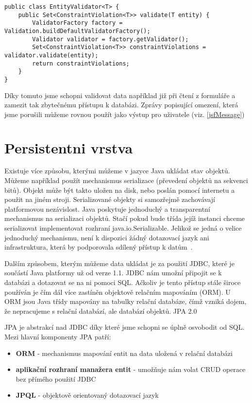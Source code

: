 \documentclass[122pt,oneside]{fithesis}
\begin{document}
\begin{lstlisting}
public class EntityValidator<T> {
	public Set<ConstraintViolation<T>> validate(T entity) {
		ValidatorFactory factory = Validation.buildDefaultValidatorFactory();
		Validator validator = factory.getValidator();
		Set<ConstraintViolation<T>> constraintViolations = validator.validate(entity);
		return constraintViolations;
	}
}
\end{lstlisting}

Díky tomuto jsme schopni validovat data například již při čtení z formuláře a zamezit tak zbytečnému přístupu k databázi. Zprávy popisující omezení, která jsme porušili můžeme rovnou použít jako výstup pro uživatele (viz. \ref{jsfMessage})

\section{Persistentni vrstva}
Existuje více způsobu, kterými můžeme v jazyce Java ukládat stav objektů. Můžeme například použít mechanismus serializace (převedení objektů na sekvenci bitů). Objekt může být takto uložen na disk, nebo poslán pomocí internetu a použit na jiném stroji. Serializované objekty si samozřejmě zachovávají platformovou nezávislost. Java poskytuje jednoduchý a transparentní mechanismus na serializaci objektů. Stačí pokud bude třída jejíž instanci chceme serializovat implementovat rozhraní java.io.Serializable. Jelikož se jedná o velice jednoduchý mechanismu, není k dispozici žádný dotazovací jazyk ani infrastruktura, která by podporovala sdílený přístup k datům~\cite{goncalves09}.

	Dalším způsobem, kterým můžeme data ukládat je za použití JDBC, které je součástí Java platformy už od verze 1.1. JDBC nám umožní připojit se k databázi a dotazovat se na ni pomoci SQL. Ačkoliv je tento přístup stále široce používán je čím dál více zastíněn objektově relačním mapováním (ORM). U ORM jsou Java třídy mapovány na tabulky relační databáze, čímž vzniká dojem, že nepracujeme s relační databází, ale databází objektů.
JPA 2.0

JPA je abstrakcí nad JDBC díky které jsme schopni se úplně osvobodit od SQL. Mezi hlavní komponenty JPA patří:

\begin{itemize}
  \item{\bf ORM} - mechanismus mapování entit na data uložená v relační databázi 
  \item{\bf aplikační rozhraní manažera entit} - umožňuje nám volat CRUD operace bez přímého použití JDBC
  \item{\bf JPQL} - objektově orientovaný dotazovací jazyk
\end{itemize}
\end{document}
